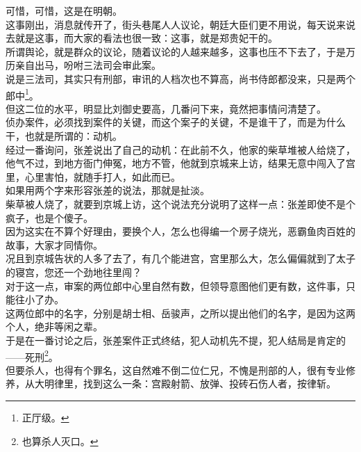 \begin{multicols}{\theparacolNo}
可惜，可惜，这是在明朝。\\

这事刚出，消息就传开了，街头巷尾人人议论，朝廷大臣们更不用说，每天说来说去就是这事，而大家的看法也很一致：这事，就是郑贵妃干的。\\

所谓舆论，就是群众的议论，随着议论的人越来越多，这事也压不下去了，于是万历亲自出马，吩咐三法司会审此案。\\

说是三法司，其实只有刑部，审讯的人档次也不算高，尚书侍郎都没来，只是两个郎中\footnote{正厅级。}。\\

但这二位的水平，明显比刘御史要高，几番问下来，竟然把事情问清楚了。\\

侦办案件，必须找到案件的关键，而这个案子的关键，不是谁干了，而是为什么干，也就是所谓的：动机。\\

经过一番询问，张差说出了自己的动机：在此前不久，他家的柴草堆被人给烧了，他气不过，到地方衙门伸冤，地方不管，他就到京城来上访，结果无意中闯入了宫里，心里害怕，就随手打人，如此而已。\\

如果用两个字来形容张差的说法，那就是扯淡。\\

柴草被人烧了，就要到京城上访，这个说法充分说明了这样一点：张差即使不是个疯子，也是个傻子。\\

因为这实在不算个好理由，要换个人，怎么也得编一个房子烧光，恶霸鱼肉百姓的故事，大家才同情你。\\

况且到京城告状的人多了去了，有几个能进宫，宫里那么大，怎么偏偏就到了太子的寝宫，您还一个劲地往里闯？\\

对于这一点，审案的两位郎中心里自然有数，但领导意图他们更有数，这件事，只能往小了办。\\

这两位郎中的名字，分别是胡士相、岳骏声，之所以提出他们的名字，是因为这两个人，绝非等闲之辈。\\

于是在一番讨论之后，张差案件正式终结，犯人动机先不提，犯人结局是肯定的——死刑\footnote{也算杀人灭口。}。\\

但要杀人，也得有个罪名，这自然难不倒二位仁兄，不愧是刑部的人，很有专业修养，从大明律里，找到这么一条：宫殿射箭、放弹、投砖石伤人者，按律斩。\\


\end{multicols}
